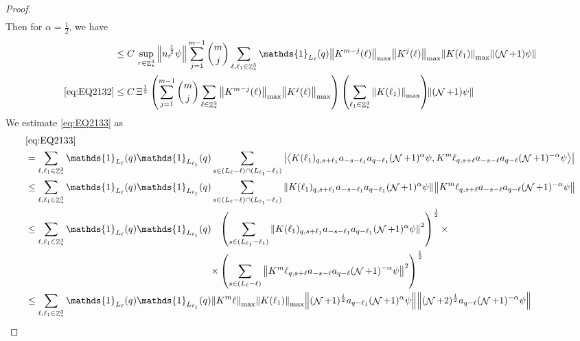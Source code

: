 \documentclass[sn-mathphys, Numbered ,a4paper]{sn-jnl}%
\DeclareMathOperator{\Z}{\mathbb{Z}}
\DeclareMathOperator{\NN}{\mathcal{N}}
\newcommand{\half}{\frac{1}{2}}
\newcommand{\eva}[1]{\left\langle #1 \right\rangle}
\theoremstyle{plain}
\theoremstyle{definition}
\theoremstyle{remark}
\theoremstyle{plain}
\theoremstyle{definition}
\theoremstyle{remark}
\begin{document}
\begin{proof}
\begin{align}
\end{align} 
Then for $\alpha = \half$, we have
\begin{align}
	&\leq C\, \sup\limits_{r \in \Z^3_*} \norm{ n_{r}^{\,\half} \psi } \sum\limits_{j=1}^{m-1} {{m}\choose j} \sum\limits_{\ell, \ell_1\in \Z^3_*} \mathds{1}_{L_{\ell}}(q) \norm{K^{m-j}(\ell)}_{\mathrm{max}} \norm{K^{j}(\ell)}_{\mathrm{max}} \norm{ K(\ell_1)}_{\mathrm{max}} \norm{(\NN+1) \psi} \nonumber\\
	\eqref{eq:EQ2132} &\leq  C \, \Xi^\half \left(  \sum\limits_{j=1}^{m-1} {{m}\choose j} \sum\limits_{\ell \in \Z^3_*} \norm{K^{m-j}(\ell)}_{\mathrm{max}} \norm{ K^{j}(\ell)}_{\mathrm{max}}\right) \left( \sum\limits_{ \ell_1\in \Z^3_*}\norm{ K(\ell_1) }_{\mathrm{max}} \right)\!\! \norm{(\NN+1) \psi }\label{eq:estEQ2132}
\end{align}
We estimate \eqref{eq:EQ2133} as
\begin{align}
    &\eqref{eq:EQ2133}\nonumber\\
    &=\sum\limits_{\ell, \ell_1\in \Z^3_*} \mathds{1}_{L_{\ell}}(q) \mathds{1}_{L_{\ell_1}}(q) \sum\limits_{ s \in (L_{\ell}-\ell) \cap (L_{\ell_1}-\ell_1)} \abs{\eva{K(\ell_1)_{q,s+\ell_1} a_{-s-\ell_1} a_{q-\ell_1}  (\NN+1)^{\alpha}\psi, K^m{\ell}_{q,s+\ell}  a_{-s-\ell} a_{q-\ell} (\NN+1)^{-\alpha} \psi }} \nonumber\\
    &\leq \sum\limits_{\ell, \ell_1\in \Z^3_*} \mathds{1}_{L_{\ell}}(q) \mathds{1}_{L_{\ell_1}}(q) \sum\limits_{ s \in (L_{\ell}-\ell) \cap (L_{\ell_1}-\ell_1)} \norm{K(\ell_1)_{q,s+\ell_1} a_{-s-\ell_1} a_{q-\ell_1}  (\NN+1)^{\alpha}\psi}\norm{ K^m{\ell}_{q,s+\ell}  a_{-s-\ell} a_{q-\ell} (\NN+1)^{-\alpha} \psi } \nonumber\\
    &\leq \sum\limits_{\ell, \ell_1\in \Z^3_*} \mathds{1}_{L_{\ell}}(q) \mathds{1}_{L_{\ell_1}}(q) \begin{aligned}[t]&\left(\sum\limits_{ s \in  (L_{\ell_1}-\ell_1)} \norm{K(\ell_1)_{q,s+\ell_1} a_{-s-\ell_1} a_{q-\ell_1}  (\NN+1)^{\alpha}\psi}^2\right)^\half \times \nonumber\\ \times &\left( \sum\limits_{ s \in (L_{\ell}-\ell) } \norm{ K^m{\ell}_{q,s+\ell}  a_{-s-\ell} a_{q-\ell} (\NN+1)^{-\alpha} \psi }^2\right)^\half \end{aligned}\nonumber\\
    &\leq \sum\limits_{\ell, \ell_1\in \Z^3_*} \mathds{1}_{L_{\ell}}(q) \mathds{1}_{L_{\ell_1}}(q) \norm{K^m{\ell}}_{\mathrm{max}} \norm{K(\ell_1)}_{\mathrm{max}} \norm{ (\NN+1)^\half a_{q-\ell_1}  (\NN+1)^{\alpha}\psi} \norm{  (\NN+2)^\half  a_{q-\ell} (\NN+1)^{-\alpha} \psi } \nonumber

\end{align}
\end{proof}
\end{document}
